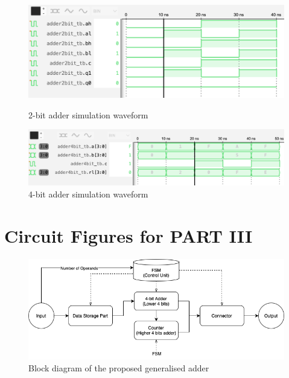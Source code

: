 \documentclass[11pt]{article}
\begin{document}
\begin{appendix}
\begin{figure}[h!]
	\centering
	\begin{minipage}{0.45\textwidth}
		\centering
		\includegraphics[width=\textwidth]{adder2bit_tb.png}
		\caption{2-bit adder simulation waveform}
		\label{fig:2bit_adder_waveform}
	\end{minipage}
	\hfill
	\begin{minipage}{0.5\textwidth}
		\centering
		\includegraphics[width=\textwidth]{adder4bit_tb.png}
		\caption{4-bit adder simulation waveform}
		\label{fig:4bit_adder_waveform}
	\end{minipage}
\end{figure}

\section{Circuit Figures for PART III}
\label{app:b}

\begin{figure}[h!]
	\centering
	\includegraphics[width=\textwidth]{block-diagram.png}
	\caption[block]{Block diagram of the proposed generalised adder\footnotemark}
	\label{fig:block_diagram}
\end{figure}


\end{appendix}
\end{document}
